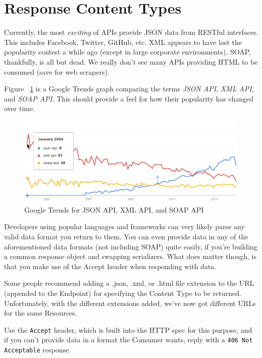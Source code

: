 \documentclass{book}
\begin{document}
\section{Response Content Types}

Currently, the most \emph{exciting} of APIs provide JSON data from RESTful interfaces. This includes Facebook, Twitter, GitHub, etc. XML appears to have lost the popularity contest a while ago (except in large corporate environments). SOAP, thankfully, is all but dead. We really don't see many APIs providing HTML to be consumed (save for web scrapers).

Figure ~\ref{fig:googletrends} is a Google Trends graph comparing the terms \emph{JSON API}, \emph{XML API}, and \emph{SOAP API}. This should provide a feel for how their popularity has changed over time.

\begin{figure}[ht!]
\centering
\includegraphics[width=120mm]{images/xml-vs-json-vs-soap-google-trends.png}
\caption{Google Trends for JSON API, XML API, and SOAP API}
\label{fig:googletrends}
\end{figure}

Developers using popular languages and frameworks can very likely parse any valid data format you return to them. You can even provide data in any of the aforementioned data formats (not including SOAP) quite easily, if you're building a common response object and swapping serializers. What does matter though, is that you make use of the Accept header when responding with data.

Some people recommend adding a .json, .xml, or .html file extension to the URL (appended to the Endpoint) for specifying the Content Type to be returned. Unfortunately, with the different extensions added, we've now got different URLs for the same Resources.

Use the \texttt{Accept} header, which is built into the HTTP spec for this purpose, and if you can't provide data in a format the Consumer wants, reply with a \texttt{406 Not Acceptable} response.
\end{document}
